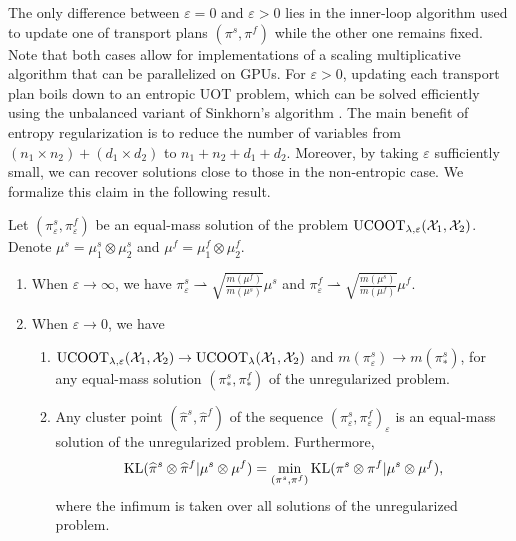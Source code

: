 The only difference between $\varepsilon = 0$ and $\varepsilon > 0$
lies in the inner-loop algorithm used to update one of transport plans $(\pi^s, \pi^f)$
while the other one remains fixed. Note that both cases allow for
implementations of a scaling multiplicative algorithm that can be parallelized on GPUs.
For $\varepsilon > 0$, updating each transport plan boils down to an entropic UOT problem,
which can be solved efficiently using the unbalanced variant of Sinkhorn's algorithm \citep{Chizat18a}.
The main benefit of entropy regularization is to reduce the number of variables
from $(n_1 \times n_2) + (d_1 \times d_2)$ to $n_1 + n_2 + d_1 + d_2$.
Moreover, by taking $\varepsilon$ sufficiently small, we can recover solutions
close to those in the non-entropic case. We formalize this claim in the following result.
\begin{proposition}
  \label{convergence_minimiser_unbalanced}
  Let $(\pi_{\varepsilon}^s, \pi_{\varepsilon}^f)$ be an equal-mass solution of the problem
  $\text{UCOOT}_{\lambda, \varepsilon}(\mathcal X_1, \mathcal X_2)$. Denote $\mu^s = \mu_1^s \otimes \mu_2^s$
  and $\mu^f = \mu_1^f \otimes \mu_2^f$.
  \begin{enumerate}
    \item When $\varepsilon \to \infty$, we have $\pi_{\varepsilon}^s \rightharpoonup
    \sqrt{\frac{m(\mu^f)}{m(\mu^s)}} \mu^s$
    and $\pi_{\varepsilon}^f \rightharpoonup \sqrt{\frac{m(\mu^s)}{m(\mu^f)}} \mu^f$.

    \item When $\varepsilon \to 0$, we have
    \begin{enumerate}
      \item $\text{UCOOT}_{\lambda, \varepsilon}(\mathcal X_1, \mathcal X_2) \to \text{UCOOT}_{\lambda}(\mathcal X_1, \mathcal X_2)$ and
      $m(\pi_{\varepsilon}^s) \to m(\pi_*^s)$, for any equal-mass solution
      $(\pi_*^s, \pi_*^f)$ of the unregularized problem.

      \item Any cluster point $(\widehat{\pi}^s, \widehat{\pi}^f)$ of the sequence
      $(\pi_{\varepsilon}^s, \pi_{\varepsilon}^f)_{\varepsilon}$ is an equal-mass
      solution of the unregularized problem. Furthermore,
      \begin{equation}
        \text{KL}(\widehat{\pi}^s \otimes \widehat{\pi}^f | \mu^s \otimes \mu^f) =
        \min_{(\pi^s, \pi^f)} \text{KL}(\pi^s \otimes \pi^f \vert \mu^s \otimes \mu^f),
      \end{equation}
      where the infimum is taken over all solutions of the unregularized problem.
    \end{enumerate}
  \end{enumerate}
\end{proposition}

